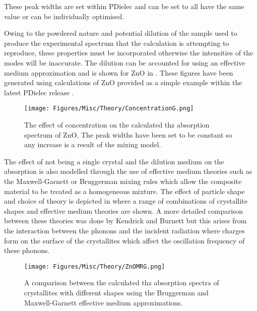 These peak widths are set within PDielec and can be set to all have the same value or can be individually optimised.

Owing to the powdered nature and potential dilution of the sample used to produce the experimental spectrum that the calculation is attempting to reproduce, these properties must be incorporated otherwise the intensities of the modes will be inaccurate. The dilution can be accounted for using an effective medium approximation and is shown for ZnO in . These figures have been generated using calculations of ZnO provided as a simple example within the latest PDielec release \DIFdelbegin \DIFdel{~}\DIFdelend \cite{john_kendrick_2022_5888313}.

\begin{figure}
    \centering
    \texttt{[image: Figures/Misc/Theory/ConcentrationG.png]}
    \captionsetup{font = footnotesize, justification = centering}
    \caption[The Effect of Concentration on the Calculated THz Absorption Spectrum of ZnO]{The effect of concentration on the calculated \acrshort{thz} absorption spectrum of ZnO. The peak widths have been set to be constant so any increase is a result of the mixing model.}
    \label{fig:ConcPDGUI}
\end{figure}

The effect of not being a single crystal and the dilution medium on the absorption is also modelled through the use of effective medium theories such as the Maxwell\nobreakdash-Garnett or Bruggerman mixing rules which allow the composite material to be treated as a homogeneous mixture. The effect of particle shape and choice of theory is depicted in  where a range of combinations of crystallite shapes and effective medium theories are shown. A more detailed comparison between these theories was done by Kendrick and Burnett \DIFdelbegin \DIFdel{~}\DIFdelend \cite{Kendrick2020} but this arises from the interaction between the phonons and the incident radiation where charges form on the surface of the crystallites which affect the oscillation frequency of these phonons. 

\begin{figure}
    \centering
    \texttt{[image: Figures/Misc/Theory/ZnOMRG.png]}
    \captionsetup{font = footnotesize, justification = centering}
    \caption[A Comparison between Crystallites of Different Shapes using the Bruggerman and Maxwell-Garnett Effective Medium Approximations]{A comparison between the calculated \acrshort{thz} absorption spectra of crystallites with different shapes using the Bruggerman and Maxwell-Garnett effective medium approximations.}
    \label{fig:EMAsShapes}
\end{figure}


